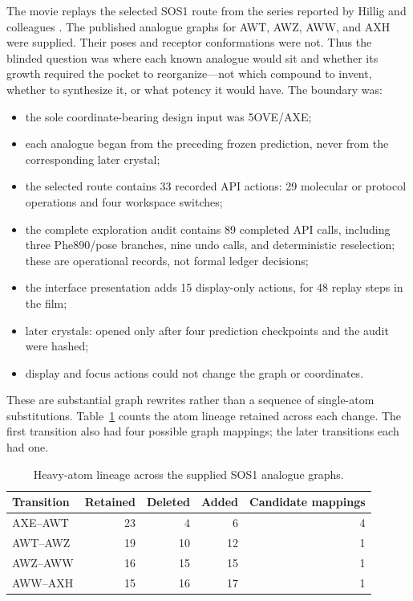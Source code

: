 The movie replays the selected SOS1 route from the series reported by Hillig
and colleagues \cite{hillig2019bay293}. The published analogue graphs for AWT,
AWZ, AWW, and AXH were supplied. Their poses and receptor conformations were
not. Thus the blinded question was where each known analogue would sit and
whether its growth required the pocket to reorganize---not which compound to
invent, whether to synthesize it, or what potency it would have. The boundary
was:

\begin{itemize}
  \item the sole coordinate-bearing design input was 5OVE/AXE;
  \item each analogue began from the preceding frozen prediction, never from
    the corresponding later crystal;
  \item the selected route contains 33 recorded API actions: 29 molecular or
    protocol operations and four workspace switches;
  \item the complete exploration audit contains 89 completed API calls,
    including three Phe890/pose branches, nine undo calls, and deterministic
    reselection; these are operational records, not formal ledger decisions;
  \item the interface presentation adds 15 display-only actions, for 48 replay
    steps in the film;
  \item later crystals: opened only after four prediction checkpoints and the
    audit were hashed;
  \item display and focus actions could not change the graph or coordinates.
\end{itemize}

These are substantial graph rewrites rather than a sequence of single-atom
substitutions. Table~\ref{tab:sos1-graph-edits} counts the atom lineage retained
across each change. The first transition also had four possible graph mappings;
the later transitions each had one.

\begin{table}[htbp]
  \centering
  \caption{Heavy-atom lineage across the supplied SOS1 analogue graphs.}
  \label{tab:sos1-graph-edits}
  \footnotesize
  \begin{tabular}{@{}lrrrr@{}}
    \toprule
    Transition & Retained & Deleted & Added & Candidate mappings \\
    \midrule
    AXE--AWT & 23 & 4 & 6 & 4 \\
    AWT--AWZ & 19 & 10 & 12 & 1 \\
    AWZ--AWW & 16 & 15 & 15 & 1 \\
    AWW--AXH & 15 & 16 & 17 & 1 \\
    \bottomrule
  \end{tabular}
\end{table}

